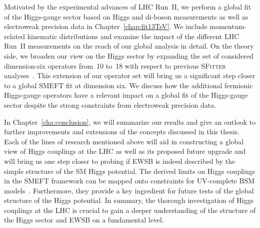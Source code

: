 Motivated by the experimental advances of LHC Run~II, we perform a global fit of the Higgs-gauge sector 
based on Higgs and di-boson measurements as well as electroweak precision data in Chapter~\ref{chap:fit13TeV}. 
We include momentum-related kinematic distributions 
and examine the impact of the different LHC Run~II measurements on the reach of our 
global analysis in detail. 
On the theory side, we broaden our view on the Higgs sector by expanding 
the set of considered dimension-six operators from~10 to~18 with respect to 
previous \textsc{SFitter} analyses~\cite{Corbett:2015ksa,Butter:2016cvz}.
This extension of our operator set will bring 
us a significant step closer to a global SMEFT fit at dimension six.
We discuss how the additional fermionic Higgs-gauge operators have a relevant 
impact on a global fit of the Higgs-gauge sector
despite the strong constraints from electroweak precision data.

In Chapter~\ref{cha:conclusion}, we will summarize our results and give an 
outlook to further improvements and extensions of the concepts discussed 
in this thesis. 
%
Each of the lines of research mentioned above will aid in constructing a global view of Higgs 
couplings at the LHC as well as its proposed future upgrade 
and will bring us one step closer to probing if EWSB
is indeed described by the simple structure of the SM Higgs potential.
The derived limits on Higgs couplings in the SMEFT framework 
can be mapped onto constraints for UV-complete BSM models~\cite{deBlas:2017xtg,Ellis:2018gqa}.
Furthermore, they provide a key ingredient for future tests of the global structure of the Higgs potential. 
In summary, the thorough investigation of Higgs couplings at the LHC is crucial 
to gain a deeper understanding of the structure of the Higgs sector and EWSB on a fundamental level.
\enlargethispage{2ex}


%

